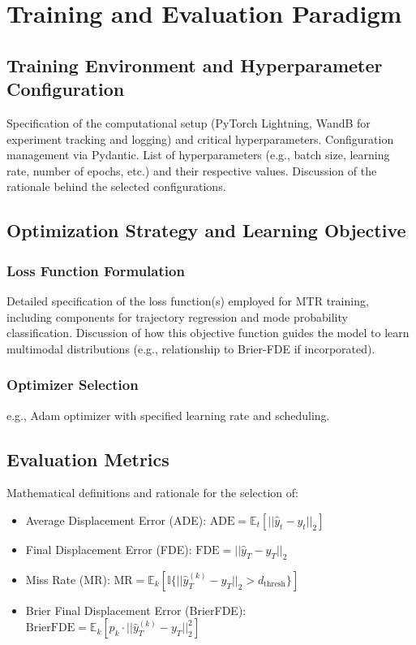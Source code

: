 

\chapter{Training and Evaluation Paradigm}
\label{ch:experimental_design}

\section{Training Environment and Hyperparameter Configuration}
\label{sec:exp_training_env}
Specification of the computational setup (PyTorch Lightning, WandB for experiment tracking and logging) and critical hyperparameters. Configuration management via Pydantic. List of hyperparameters (e.g., batch size, learning rate, number of epochs, etc.) and their respective values. Discussion of the rationale behind the selected configurations.

\section{Optimization Strategy and Learning Objective}
\label{sec:exp_optimization}
    \subsection{Loss Function Formulation}
    Detailed specification of the loss function(s) employed for MTR training, including components for trajectory regression and mode probability classification. Discussion of how this objective function guides the model to learn multimodal distributions (e.g., relationship to Brier-FDE if incorporated).
    \subsection{Optimizer Selection}
    e.g., Adam optimizer with specified learning rate and scheduling.

\section{Evaluation Metrics}
\label{sec:exp_metrics}
Mathematical definitions and rationale for the selection of:
\begin{itemize}
    \item Average Displacement Error (ADE): $\text{ADE}=\mathbb{E}_{t}[||\hat{y}_{t}-y_{t}||_{2}]$
    \item Final Displacement Error (FDE): $\text{FDE}=||\hat{y}_{T}-y_{T}||_{2}$
    \item Miss Rate (MR): $\text{MR}=\mathbb{E}_{k}[\mathbb{I}\{||\hat{y}_{T}^{(k)}-y_{T}||_{2}>d_{\text{thresh}}\}]$
    \item Brier Final Displacement Error (BrierFDE): $\text{BrierFDE}=\mathbb{E}_{k}[p_{k}\cdot||\hat{y}_{T}^{(k)}-y_{T}||_{2}^{2}]$
\end{itemize}


